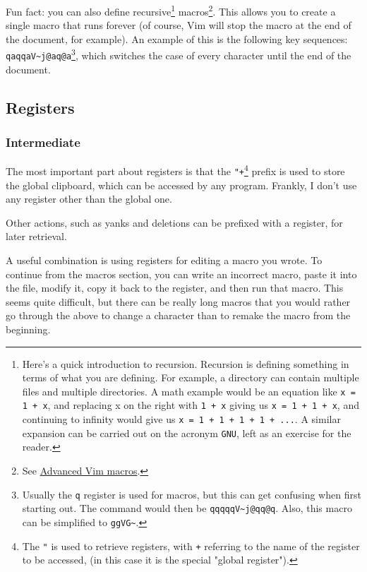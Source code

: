 \documentclass[11pt]{article}
\begin{document}
Fun fact: you can also define recursive\footnote{Here's a quick introduction to recursion. Recursion is defining 
something in terms of what you are defining. For example, a directory 
can contain multiple files and multiple directories. A math example 
would be an equation like \texttt{x = 1 + x}, and replacing x on the right with
\texttt{1 + x} giving us \texttt{x = 1 + 1 + x}, and continuing to infinity would give
us \texttt{x = 1 + 1 + 1 + 1 + ...}. A similar expansion can be carried out 
on the acronym \texttt{GNU}, left as an exercise for the reader.} macros\footnote{See \href{https://sanctum.geek.nz/arabesque/advanced-vim-macros/}{Advanced Vim macros}.}. This
allows you to create a single macro that runs forever (of course, Vim will stop
the macro at the end of the document, for example). An example of this is the
following key sequences: \texttt{qaqqaV\textasciitilde{}j@aq@a}\footnote{Usually the \texttt{q} register is used for macros, but this can get
confusing when first starting out. The command would then be \texttt{qqqqqV\textasciitilde{}j@qq@q}.
Also, this macro can be simplified to \texttt{ggVG\textasciitilde{}}.}, which switches the case of every
character until the end of the document. 
\subsection{Registers}
\label{sec:orga85fe12}
\subsubsection{Intermediate}
\label{sec:org9f9b74b}
The most important part about registers is that the \texttt{"+}\footnote{The \texttt{"} is used to retrieve registers, with \texttt{+} referring to 
the name of the register to be accessed, (in this case it is the 
special "global register").} prefix is used
to store the global clipboard, which can be accessed by any program. Frankly, I
don't use any register other than the global one.

Other actions, such as yanks and deletions can be prefixed with a register, for
later retrieval.

A useful combination is using registers for editing a macro you wrote. To
continue from the macros section, you can write an incorrect macro, paste it
into the file, modify it, copy it back to the register, and then run that macro.
This seems quite difficult, but there can be really long macros that you would
rather go through the above to change a character than to remake the macro from
the beginning.
\end{document}
